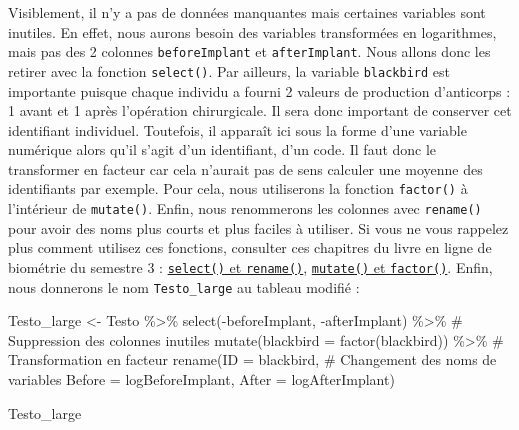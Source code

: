 \documentclass[
  a4paper,
  DIV=11,
  numbers=noendperiod,
  oneside]{scrreprt}
\newenvironment{Shaded}{}{}
\newcommand{\AttributeTok}[1]{\textcolor[rgb]{0.84,0.23,0.29}{#1}}
\newcommand{\CommentTok}[1]{\textcolor[rgb]{0.42,0.45,0.49}{#1}}
\newcommand{\FunctionTok}[1]{\textcolor[rgb]{0.44,0.26,0.76}{#1}}
\newcommand{\NormalTok}[1]{\textcolor[rgb]{0.14,0.16,0.18}{#1}}
\newcommand{\OtherTok}[1]{\textcolor[rgb]{0.44,0.26,0.76}{#1}}
\newcommand{\SpecialCharTok}[1]{\textcolor[rgb]{0.00,0.36,0.77}{#1}}
\begin{document}
Visiblement, il n'y a pas de données manquantes mais certaines variables
sont inutiles. En effet, nous aurons besoin des variables transformées
en logarithmes, mais pas des 2 colonnes \texttt{beforeImplant} et
\texttt{afterImplant}. Nous allons donc les retirer avec la fonction
\texttt{select()}. Par ailleurs, la variable \texttt{blackbird} est
importante puisque chaque individu a fourni 2 valeurs de production
d'anticorps : 1 avant et 1 après l'opération chirurgicale. Il sera donc
important de conserver cet identifiant individuel. Toutefois, il
apparaît ici sous la forme d'une variable numérique alors qu'il s'agit
d'un identifiant, d'un code. Il faut donc le transformer en facteur car
cela n'aurait pas de sens calculer une moyenne des identifiants par
exemple. Pour cela, nous utiliserons la fonction \texttt{factor()} à
l'intérieur de \texttt{mutate()}. Enfin, nous renommerons les colonnes
avec \texttt{rename()} pour avoir des noms plus courts et plus faciles à
utiliser. Si vous ne vous rappelez plus comment utilisez ces fonctions,
consulter ces chapitres du livre en ligne de biométrie du semestre 3 :
\href{https://besibo.github.io/BiometrieS3/04-DataWrangling.html\#sélectionner-des-variables-avec-select}{\texttt{select()}
et \texttt{rename()}},
\href{https://besibo.github.io/BiometrieS3/04-DataWrangling.html\#mutate}{\texttt{mutate()}
et \texttt{factor()}}. Enfin, nous donnerons le nom
\texttt{Testo\_large} au tableau modifié :

\begin{Shaded}
\begin{Highlighting}[]
\NormalTok{Testo\_large }\OtherTok{\textless{}{-}}\NormalTok{ Testo }\SpecialCharTok{\%\textgreater{}\%} 
  \FunctionTok{select}\NormalTok{(}\SpecialCharTok{{-}}\NormalTok{beforeImplant, }\SpecialCharTok{{-}}\NormalTok{afterImplant) }\SpecialCharTok{\%\textgreater{}\%}  \CommentTok{\# Suppression des colonnes inutiles}
  \FunctionTok{mutate}\NormalTok{(}\AttributeTok{blackbird =} \FunctionTok{factor}\NormalTok{(blackbird)) }\SpecialCharTok{\%\textgreater{}\%}  \CommentTok{\# Transformation en facteur }
  \FunctionTok{rename}\NormalTok{(}\AttributeTok{ID =}\NormalTok{ blackbird,                     }\CommentTok{\# Changement des noms de variables}
         \AttributeTok{Before =}\NormalTok{ logBeforeImplant,}
         \AttributeTok{After =}\NormalTok{ logAfterImplant)}

\NormalTok{Testo\_large}
\end{Highlighting}
\end{Shaded}
\end{document}
